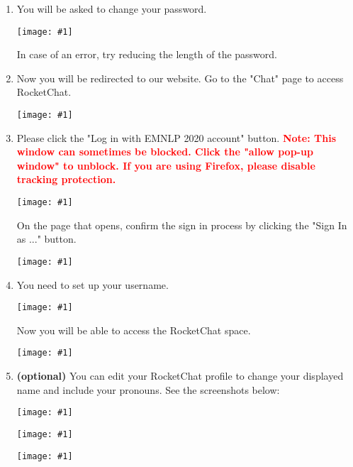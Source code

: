 \documentclass[11pt]{scrartcl}
\makeatletter
\newcommand{\vfig}[1]{%
	\begin{center}
		\texttt{[image: \#1]}
	\end{center}
}
\newcommand{\conferenceName}{EMNLP 2020\xspace}
\newcommand{\helpdeskEmail}{virtual.2020@emnlp.org}
\makeatother
\begin{document}
\begin{enumerate}
\begin{sloppypar}
			\textbf{\textcolor{red}{PLEASE NOTE}}:
			\begin{itemize}
				\item Make sure you received a welcome email with username (see \cref{step:registration})
				\item The username is case-sensitive
				\item Make sure there are no extra spaces in your password
				\item Try typing in the username/password instead of copy-pasting (just to make sure you don't miss out on any characters). \textbf{The password has 8 characters in total.}
			\end{itemize}
	
			If you are still unable to login, please contact: \href{mailto:\helpdeskEmail}{\helpdeskEmail} and \textbf{include the username/password you were sent in the welcome email}.

		\end{sloppypar}

		\vfig{sign-in}
	\item You will be asked to change your password.
	
		\vfig{change-password}
		
		In case of an error, try reducing the length of the password.	
	
	\item Now you will be redirected to our website. Go to the "Chat" page to access RocketChat.
	
		\vfig{chat-page}
	
	\item Please click the "Log in with \conferenceName account" button. \textbf{\textcolor{red}{Note: This window can sometimes be blocked. Click the "allow pop-up window" to unblock. If you are using Firefox, please disable tracking protection.}}
	
		\vfig{rocket-chat-login}
	
		On the page that opens, confirm the sign in process by clicking the "Sign In as ..." button.
		
		\vfig{sign-in-as}
		
	\item You need to set up your username.
	
		\vfig{register-username}
	
		Now you will be able to access the RocketChat space.
		
		\vfig{rocket-chat-space}
	
	\item \textbf{(optional)} You can edit your RocketChat profile to change your displayed name and include your pronouns. See the screenshots below:
		
		\vfig{rocket-chat-profile-1}
		\vfig{rocket-chat-profile-2}
		\vfig{rocket-chat-profile-3}
\end{enumerate}
	
\end{document}
